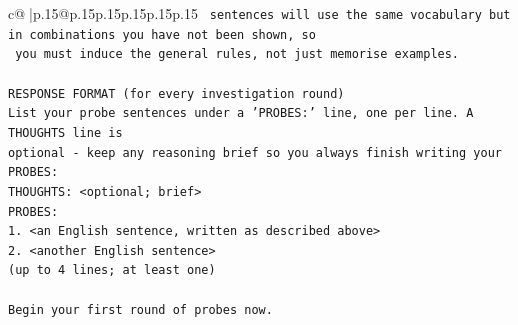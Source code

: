 \documentclass{article}
\begin{document}
{\begin{supertabular}{c@{$\;$}|p{.15\linewidth}@{}p{.15\linewidth}p{.15\linewidth}p{.15\linewidth}p{.15\linewidth}p{.15\linewidth}}
{{{\texttt{   sentences will use the same vocabulary but in combinations you have not been shown, so} \\
\texttt{   you must induce the general rules, not just memorise examples.} \\
\\ 
\texttt{RESPONSE FORMAT (for every investigation round)} \\
\texttt{List your probe sentences under a 'PROBES:' line, one per line. A THOUGHTS line is} \\
\texttt{optional {-} keep any reasoning brief so you always finish writing your PROBES:} \\
\texttt{THOUGHTS: <optional; brief>} \\
\texttt{PROBES:} \\
\texttt{1. <an English sentence, written as described above>} \\
\texttt{2. <another English sentence>} \\
\texttt{(up to 4 lines; at least one)} \\
\\ 
\texttt{Begin your first round of probes now.} \\
            }
        }
    }
     \\ \\


\end{supertabular}}
\end{document}
